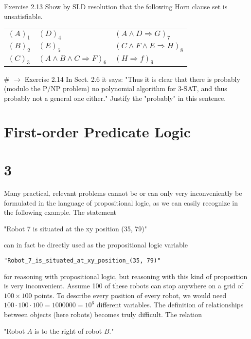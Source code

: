 \documentclass[10pt]{article}
\begin{document}
Exercise 2.13 Show by SLD resolution that the following Horn clause set is unsatisfiable.

\begin{center}
\begin{tabular}{lll}
$(A)_{1}$ & $(D)_{4}$ & $(A \wedge D \Rightarrow G)_{7}$ \\
$(B)_{2}$ & $(E)_{5}$ & $(C \wedge F \wedge E \Rightarrow H)_{8}$ \\
$(C)_{3}$ & $(A \wedge B \wedge C \Rightarrow F)_{6}$ & $(H \Rightarrow f)_{9}$ \\
\end{tabular}
\end{center}

\# $\rightarrow$ Exercise 2.14 In Sect. 2.6 it says: "Thus it is clear that there is probably (modulo the P/NP problem) no polynomial algorithm for 3-SAT, and thus probably not a general one either." Justify the "probably" in this sentence.

\section*{First-order Predicate Logic}
\section*{3}
Many practical, relevant problems cannot be or can only very inconveniently be formulated in the language of propositional logic, as we can easily recognize in the following example. The statement

\begin{displayquote}
"Robot 7 is situated at the xy position (35, 79)"
\end{displayquote}

can in fact be directly used as the propositional logic variable

\begin{verbatim}
"Robot_7_is_situated_at_xy_position_(35, 79)"
\end{verbatim}

for reasoning with propositional logic, but reasoning with this kind of proposition is very inconvenient. Assume 100 of these robots can stop anywhere on a grid of $100 \times 100$ points. To describe every position of every robot, we would need $100 \cdot 100 \cdot 100=1000000=10^{6}$ different variables. The definition of relationships between objects (here robots) becomes truly difficult. The relation

\begin{displayquote}
"Robot $A$ is to the right of robot $B$."
\end{displayquote}
\end{document}
